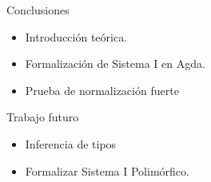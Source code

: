 \begin{frame}{Conclusiones}

	\begin{itemize}[<+->]
		\item Introducción teórica.
		\item Formalización de Sistema I en Agda.
		\item Prueba de normalización fuerte
	\end{itemize}
	
\end{frame}

\begin{frame}{Trabajo futuro}
	
	\begin{itemize}[<+->]
		\item Inferencia de tipos
		\item Formalizar Sistema I Polimórfico. 
	\end{itemize}
	
\end{frame}